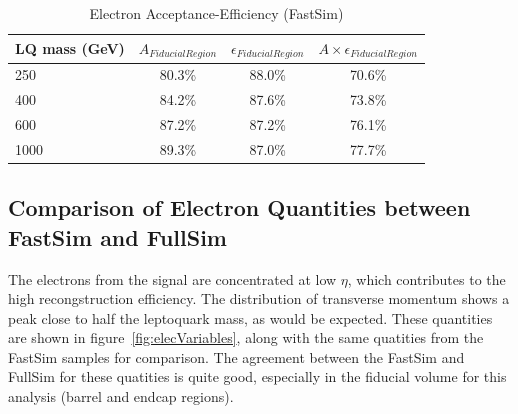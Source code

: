 \documentclass{cmspaper}
\begin{document}
  \begin{table}[htb]
    \caption{Electron Acceptance-Efficiency (FastSim)}
    \label{tab:ElecEffAcc}
    \begin{center}
      \begin{tabular}{|l|c|c|c|} \hline
	    LQ mass (GeV) & $A_{Fiducial Region}$ & $\epsilon_{Fiducial Region}$ & $A\times\epsilon_{Fiducial Region}$\\ \hline
	    250 & 80.3\% & 88.0\% & 70.6\% \\ \hline
	    400 & 84.2\% & 87.6\% & 73.8\% \\ \hline
	    600 & 87.2\% & 87.2\% & 76.1\% \\ \hline
	    1000 & 89.3\% & 87.0\% & 77.7\% \\ \hline
      \end{tabular}
    \end{center}
  \end{table}


\subsection{Comparison of Electron Quantities between FastSim and FullSim}
The electrons from the signal are concentrated at low $\eta$, which contributes to the high recongstruction efficiency.  The distribution of transverse momentum shows a peak close to half the leptoquark mass, as would be expected.  These quantities are shown in figure~\ref{fig:elecVariables}, along with the same quatities from the FastSim samples for comparison.  The agreement between the FastSim and FullSim for these quatities is quite good, especially in the fiducial volume for this analysis (barrel and endcap regions).
\end{document}
